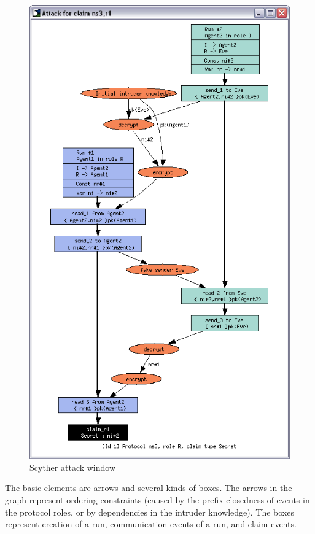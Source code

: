 \documentclass{book}
\begin{document}
\begin{figure}[!htb]
  \begin{center}
    \includegraphics[scale=0.53]{attackwindow}
  \end{center}
  \label{attackwindowbig}
  \caption{Scyther attack window}
\end{figure}


The basic elements are arrows and several kinds of boxes. The arrows in
the graph represent ordering constraints (caused by the
prefix-closedness of events in the protocol roles, or by dependencies in
the intruder knowledge). The boxes represent creation of a run,
communication events of a run, and claim events.
\end{document}
